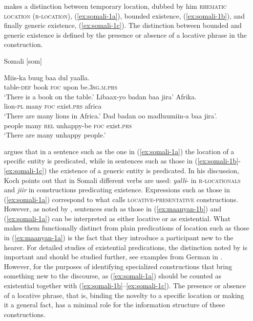 \documentclass[output=paper,chinesefont,colorlinks,citecolor=brown]{langscibook}
\begin{document}
\citet[540]{Koch2012} makes a distinction between temporary location, dubbed by him \textsc{rhematic location} (\textsc{r-location}), (\ref{ex:somali-1a}), bounded existence, (\ref{ex:somali-1b}), and finally generic existence, (\ref{ex:somali-1c}). The distinction between bounded and generic existence is defined by the presence or absence of a locative phrase in the construction.
\begin{exe}
\ex Somali [som] \citet[540]{Koch2012} \label{ex:somali-1}
\begin{xlist}
\ex \label{ex:somali-1a}
\gll Miis-ka buug baa dul yaalla.\\
table-\textsc{def} book \textsc{foc} upon be.\textsc{3sg.m.prs}\\
\glt ‘There is a book on the table.’
\ex \label{ex:somali-1b}
\gll Libaax-yo badan baa jira’ Afrika.\\
lion-\textsc{pl} many \textsc{foc} exist.\textsc{prs} africa\\
\glt ‘There are many lions in Africa.’
\ex \label{ex:somali-1c}
\gll Dad badan oo madluumiin-a baa jira’.\\
people many \textsc{rel} unhappy-be \textsc{foc} exist.\textsc{prs}\\
\glt ‘There are many unhappy people.’

\end{xlist}
\end{exe}
\citet[238--240]{Koch2012} argues that in a sentence such as the one in (\ref{ex:somali-1a}) the location of a specific entity is predicated, while in sentences such as those in (\ref{ex:somali-1b}-\ref{ex:somali-1c}) the existence of a generic entity is predicated. In his discussion, Koch points out that in Somali different verbs are used: \textit{yalli}- in \textsc{r-locationals} and \textit{jiir} in constructions predicating existence. Expressions such as those in (\ref{ex:somali-1a}) correspond to what \citet{hengeveld1992} calls \textsc{locative-presentative} constructions. However, as noted by \citet{dryer2007a}, sentences such as those in (\ref{ex:maanyan-1b}) and (\ref{ex:somali-1a}) can be interpreted as either locative or as existential. What makes them functionally distinct from plain predications of location such as those in (\ref{ex:maanyan-1a}) is the fact that they introduce a participant new to the hearer. For detailed studies of existential predications, the distinction noted by \citet{Koch2012} is important and should be studied further, see examples from German in . However, for the purposes of identifying specialized constructions that bring something new to the discourse, as (\ref{ex:somali-1a}) should be counted as existential together with (\ref{ex:somali-1b}--\ref{ex:somali-1c}). The presence or absence of a locative phrase, that is, binding the novelty to a specific location or  making it a general fact, has a minimal role for the information structure of these constructions.
\end{document}
